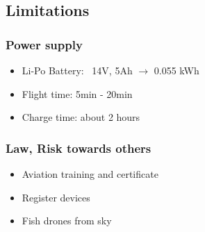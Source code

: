 \subsection{Limitations}

\begin{frame}
\frametitle{Power supply}

  \begin{itemize}
    \item Li-Po Battery: ~14V, 5Ah $\rightarrow$ 0.055 kWh
    \item Flight time: 5min - 20min
    \item Charge time: about 2 hours
  \end{itemize}
  
\end{frame}



%
%  



%
%  
%    



\begin{frame}
\frametitle{Law, Risk towards others}

  \begin{itemize}
  	\item Aviation training and certificate
    \item Register devices    
	\item Fish drones from sky
  \end{itemize}
  	
\end{frame}



